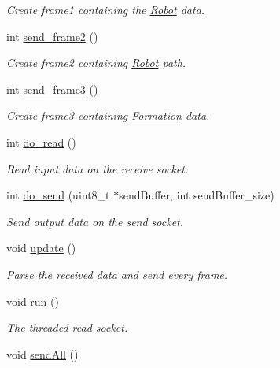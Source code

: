 \begin{DoxyCompactItemize}
\begin{DoxyCompactList}\small\item\em Create frame1 containing the \hyperlink{classRobot}{Robot} data. \end{DoxyCompactList}\item 
int \hyperlink{classUDPServer_a79979deab54cb01a0b50ada969671d56}{send\+\_\+frame2} ()
\begin{DoxyCompactList}\small\item\em Create frame2 containing \hyperlink{classRobot}{Robot} path. \end{DoxyCompactList}\item 
int \hyperlink{classUDPServer_a6b774afaed3846e2f76a9c91f674606f}{send\+\_\+frame3} ()
\begin{DoxyCompactList}\small\item\em Create frame3 containing \hyperlink{classFormation}{Formation} data. \end{DoxyCompactList}\item 
int \hyperlink{classUDPServer_a6a6bdedbe6263fd3d47a4c546d7b18a3}{do\+\_\+read} ()
\begin{DoxyCompactList}\small\item\em Read input data on the receive socket. \end{DoxyCompactList}\item 
int \hyperlink{classUDPServer_ad6b0c9536c775b43becc75ccd957ef2d}{do\+\_\+send} (uint8\+\_\+t $\ast$send\+Buffer, int send\+Buffer\+\_\+size)
\begin{DoxyCompactList}\small\item\em Send output data on the send socket. \end{DoxyCompactList}\item 
void \hyperlink{classUDPServer_a466fc85beccb1b6c49566a326558181f}{update} ()\hypertarget{classUDPServer_a466fc85beccb1b6c49566a326558181f}{}\label{classUDPServer_a466fc85beccb1b6c49566a326558181f}

\begin{DoxyCompactList}\small\item\em Parse the received data and send every frame. \end{DoxyCompactList}\item 
void \hyperlink{classUDPServer_ab30d892e78733f051ade74aa7dc0cab8}{run} ()\hypertarget{classUDPServer_ab30d892e78733f051ade74aa7dc0cab8}{}\label{classUDPServer_ab30d892e78733f051ade74aa7dc0cab8}

\begin{DoxyCompactList}\small\item\em The threaded read socket. \end{DoxyCompactList}\item 
void \hyperlink{classUDPServer_a43c0540544b344eb4826d9d80e94ce2b}{send\+All} ()\hypertarget{classUDPServer_a43c0540544b344eb4826d9d80e94ce2b}{}\label{classUDPServer_a43c0540544b344eb4826d9d80e94ce2b}


\end{DoxyCompactItemize}
